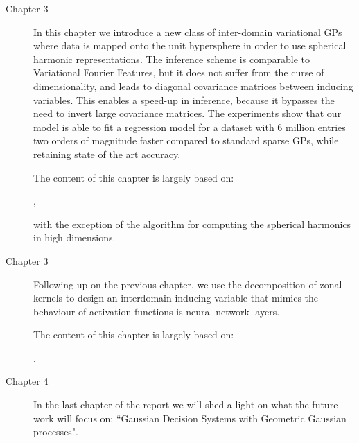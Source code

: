 \begin{description}
    \item[Chapter 3] In this chapter we introduce a new class of inter-domain variational GPs where data is mapped onto the unit hypersphere in order to use spherical harmonic representations. The inference scheme is comparable to Variational Fourier Features, but it does not suffer from the curse of dimensionality, and leads to diagonal covariance matrices between inducing variables. This enables a speed-up in inference, because it bypasses the need to invert large covariance matrices. The experiments show that our model is able to fit a regression model for a dataset with 6 million entries two orders of magnitude faster compared to standard sparse GPs, while retaining state of the art accuracy.
    
    The content of this chapter is largely based on:

    ,

    with the exception of the algorithm for computing the spherical harmonics in high dimensions.

    \item[Chapter 3] Following up on the previous chapter, we use the decomposition of zonal kernels to design an interdomain inducing variable that mimics the behaviour of activation functions is neural network layers. 

    The content of this chapter is largely based on:

    .

    \item[Chapter 4] In the last chapter of the report we will shed a light on what the future work will focus on: ``Gaussian Decision Systems with Geometric Gaussian processes".
\end{description}
